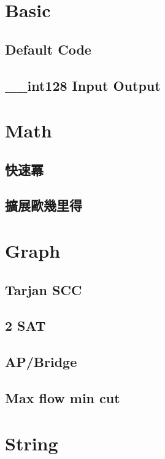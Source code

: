 \section{Basic}
\subsection{Default Code}

\subsection{__int128 Input Output}


\section{Math}
\subsection{快速冪} 

\subsection{擴展歐幾里得} 


\section{Graph}
\subsection{Tarjan SCC} 

\subsection{2 SAT} 

\subsection{AP/Bridge} 

\subsection{Max flow min cut} 


\section{String}
